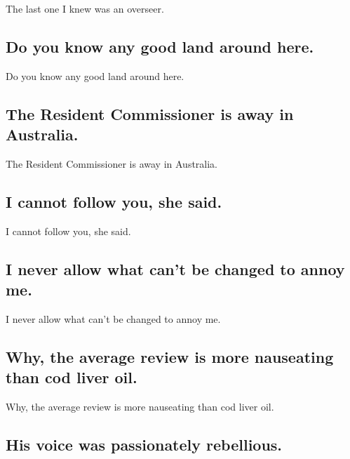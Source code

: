 \documentclass[]{article}
\begin{document}
The last one I knew was an overseer.

\hypertarget{do-you-know-any-good-land-around-here.}{%
\subsection{Do you know any good land around
here.}\label{do-you-know-any-good-land-around-here.}}

Do you know any good land around here.

\hypertarget{the-resident-commissioner-is-away-in-australia.}{%
\subsection{The Resident Commissioner is away in
Australia.}\label{the-resident-commissioner-is-away-in-australia.}}

The Resident Commissioner is away in Australia.

\hypertarget{i-cannot-follow-you-she-said.}{%
\subsection{I cannot follow you, she
said.}\label{i-cannot-follow-you-she-said.}}

I cannot follow you, she said.

\hypertarget{i-never-allow-what-cant-be-changed-to-annoy-me.}{%
\subsection{I never allow what can't be changed to annoy
me.}\label{i-never-allow-what-cant-be-changed-to-annoy-me.}}

I never allow what can't be changed to annoy me.

\hypertarget{why-the-average-review-is-more-nauseating-than-cod-liver-oil.}{%
\subsection{Why, the average review is more nauseating than cod liver
oil.}\label{why-the-average-review-is-more-nauseating-than-cod-liver-oil.}}

Why, the average review is more nauseating than cod liver oil.

\hypertarget{his-voice-was-passionately-rebellious.}{%
\subsection{His voice was passionately
rebellious.}\label{his-voice-was-passionately-rebellious.}}
\end{document}
